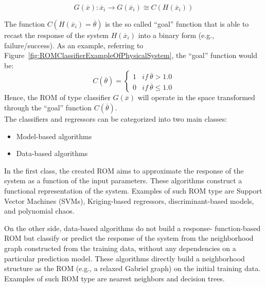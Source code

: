 \begin{equation}
\label{eq:classifier}
G\left ( \overline{x} \right ):\overline{x}_{i} \rightarrow G\left ( \overline{x}_{i} \right ) \cong
C \left ( H\left ( \overline{x}_{i} \right ) \right )
\end{equation}

The function $C\left (  H\left ( \overline{x}_{i}  \right ) = \overline{\theta}
\right ) $ is the so called ``goal'' function that is able to recast the
response of the system $H\left ( \overline{x}_{i}  \right )$ into a binary
form (e.g., failure/success). As an example, referring to
Figure~\ref{fig:ROMClassifierExampleOfPhysicalSystem}, the
``goal'' function would be:
\begin{equation}
\label{eq:goalFunctionClassifier}
C\left (   \overline{\theta}  \right ) = \left\{\begin{matrix}
1 & if \: \overline{\theta}>1.0 \\
0 &  if \: \overline{\theta} \leq 1.0
\end{matrix}\right.
\end{equation}
Hence, the ROM of type classifier $G\left (  \overline{x} \right )$  will operate in the space transformed through the ``goal''  function $C\left (   \overline{\theta}  \right )$.
\\The classifiers and regressors can be categorized into two main classes:
\begin{itemize}
  \item Model-based algorithms
  \item Data-based algorithms
\end{itemize}
In the first class, the created ROM aims to approximate the response
of the system as a function of the input parameters. These algorithms
construct a functional representation of the system. Examples of such ROM type are Support Vector Machines (SVMs), Kriging-based regressors, discriminant-based models, and polynomial chaos.

On the other side, data-based algorithms do not build a response-
function-based ROM but classify or predict the response of the
system from the neighborhood graph constructed from the training
data, without any dependencies on a particular prediction model.
These algorithms directly build a neighborhood structure as the
ROM (e.g., a relaxed Gabriel graph) on the initial training data. Examples of such ROM type are nearest neighbors and decision trees.

